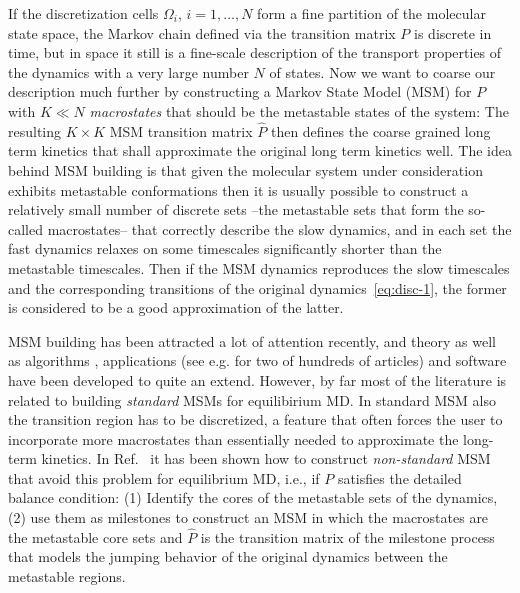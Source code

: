 \documentclass[aps, pre, preprint,unsortedaddress,a4paper,onecolumn]{revtex4}
\newcommand{\vect}[1]{#1}
\begin{document}
If the discretization cells $\Omega_i$, $i=1,\ldots,N$ form a fine
partition of the molecular state space, the Markov chain defined via
the transition matrix $P$
 is discrete in time, but in space it still is a fine-scale description of the transport properties of the
dynamics with a very large number $N$ of states.  Now we want to coarse our description much further by
constructing a Markov State Model (MSM) for $\vect P$ with $K\ll N$
\emph{macrostates} that should be the metastable states of the system: The resulting $K\times K$ MSM transition matrix $\hat{\vect P}$
then defines the coarse grained long term kinetics that shall
approximate the original long term kinetics well. 
The idea behind MSM building is that given the molecular system under consideration exhibits metastable conformations then it is usually possible to construct a
relatively small number of discrete sets --the metastable sets that form the so-called macrostates-- that
correctly describe the slow  dynamics, and 
in each set the fast dynamics relaxes on some timescales significantly shorter than the metastable timescales.
Then if the MSM dynamics reproduces the slow timescales and the corresponding transitions
of the original dynamics~\eqref{eq:disc-1},
the former is considered to be a good approximation of the latter.

MSM building has been attracted a lot of attention recently, and theory  \cite{A19-31} as well as algorithms \cite{A19-1}, applications (see e.g. \cite{A19-26,PNAS09} for two of hundreds of articles) and software \cite{A19-49, MSMBuilder} have been developed to quite an extend. However, 
by far most of the literature is related to building \emph{standard} MSMs for equilibirium MD. In standard MSM also the transition region has to be discretized, a feature that often forces the user to incorporate more macrostates than essentially needed to approximate the long-term kinetics.
In Ref.~\cite{sarich2010approximation, A19-31,schuette2011markov,BucheteHummer} it has been shown how to construct \emph{non-standard} MSM that avoid this problem for equilibrium MD, i.e., if $\vect P$ satisfies the detailed balance
condition: (1) Identify the cores of the metastable sets of the
dynamics, (2) use them as milestones to construct an MSM in which the
macrostates are the metastable core sets and $\hat{\vect P}$ is the transition
matrix of the milestone process \cite{A19-31,schuette2011markov,A19-29} that models the jumping behavior of
the original dynamics between the metastable regions. 
\end{document}
